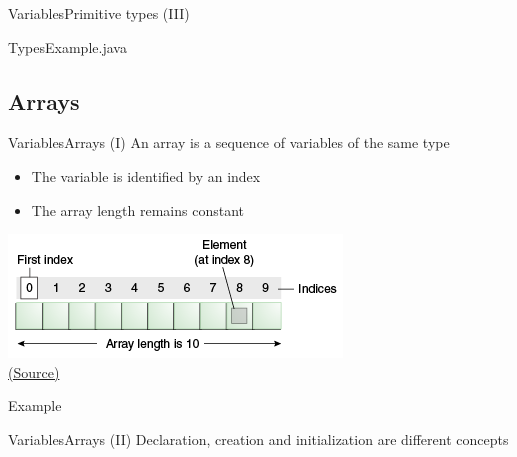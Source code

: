 \documentclass[10pt,compress]{beamer} %
\begin{document}
\begin{frame}{Variables}{Primitive types (III)}
	\begin{block}{TypesExample.java}
		
	\end{block}
\end{frame}


\subsection{Arrays}
\begin{frame}{Variables}{Arrays (I)}
	\vspace{-0.2cm}
	An \alert{array} is a sequence of variables of the same type
		\begin{itemize}
		\item The variable is identified by an index
		\item The array length remains constant
		\end{itemize}
	\centering\includegraphics[width=0.5\linewidth]{figs/objects-tenElementArray}\\
    \centering \tiny{\href{http://docs.oracle.com/javase/tutorial/java/nutsandbolts/arrays.html}{(Source)}}

	\vspace{-0.2cm}
	\normalsize{\begin{block}{Example}
	\vspace{-0.2cm}
		
	\vspace{-0.2cm}
	\end{block}}
\end{frame}

\begin{frame}{Variables}{Arrays (II)}
	Declaration, creation and initialization are different concepts
	\vspace{-0.2cm}
	\begin{block}{}
	\vspace{-0.2cm}
		
	\vspace{-0.2cm}
	\end{block}
\end{frame}
\end{document}
